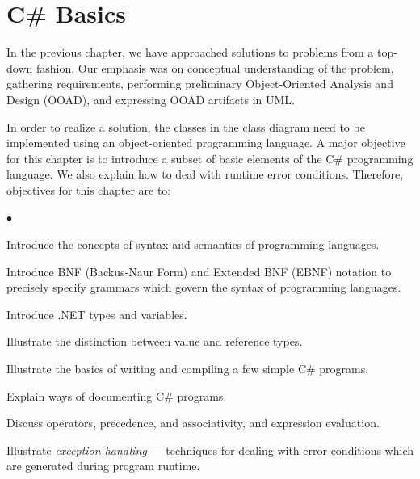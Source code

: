 

\chapter{C\# Basics} \label{ch:CSharpBasics}
\minitoc

In the previous chapter, we have approached solutions to problems
from a top-down fashion. Our emphasis was on conceptual
understanding of the problem, gathering requirements, performing
preliminary Object-Oriented Analysis and Design (OOAD), and
expressing OOAD artifacts in UML.

In order to realize a solution, the classes in the class diagram
need to be implemented using an object-oriented programming
language. A major objective for this chapter is to introduce a
subset of basic elements of the C\# programming language. We also
explain how to deal with runtime error conditions. Therefore,
objectives for this chapter are to:

\begin{list}{$\bullet$}{\itemsep 0.05in \parskip 0in \parsep 0in}

\item Introduce the concepts of syntax and semantics of
programming languages.

\item Introduce BNF (Backus-Naur Form) and Extended BNF (EBNF)
notation to precisely specify grammars which govern the syntax of
programming languages.

\item Introduce .NET types and variables.


\item Illustrate the distinction between value and reference
types.

\item Illustrate the basics of writing and compiling a few simple
C\# programs.

\item Explain ways of documenting C\# programs.

\item Discuss operators, precedence, and associativity, and
expression evaluation.


\item Illustrate \emph{exception handling} --- techniques for
dealing with error conditions which are generated during program
runtime.


\end{list}


